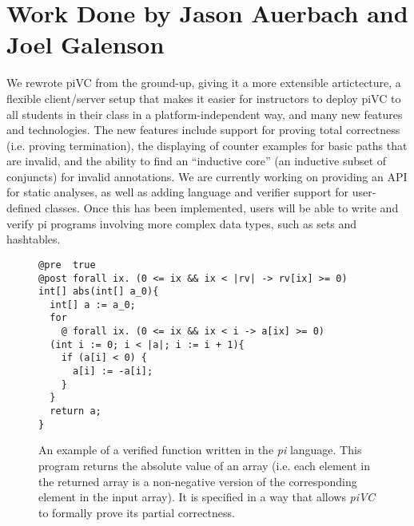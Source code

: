 \documentclass{article}
\begin{document}
\section{Work Done by Jason Auerbach and Joel Galenson}
We rewrote piVC from the ground-up, giving it a more extensible artictecture, a flexible client/server setup that makes it easier for instructors to deploy piVC to all students in their class in a platform-independent way, and many new features and technologies. The new features include support for proving total correctness (i.e. proving termination), the displaying of counter examples for basic paths that are invalid, and the ability to find an ``inductive core'' (an inductive subset of conjuncts) for invalid annotations. We are currently working on providing an API for static analyses, as well as adding language and verifier support for user-defined classes. Once this has been implemented, users will be able to write and verify pi programs involving more complex data types, such as sets and hashtables.

\begin{figure}
\begin{verbatim}
@pre  true
@post forall ix. (0 <= ix && ix < |rv| -> rv[ix] >= 0)
int[] abs(int[] a_0){
  int[] a := a_0;
  for
    @ forall ix. (0 <= ix && ix < i -> a[ix] >= 0)
  (int i := 0; i < |a|; i := i + 1){
    if (a[i] < 0) {
      a[i] := -a[i];
    }
  }
  return a;
}
\end{verbatim}
\caption{An example of a verified function written in the \textit{pi} language. This program returns the absolute value of an array (i.e. each element in the returned array is a non-negative version of the corresponding element in the input array). It is specified in a way that allows \textit{piVC} to formally prove its partial correctness.}
\label{example_program}
\end{figure}
\end{document}

